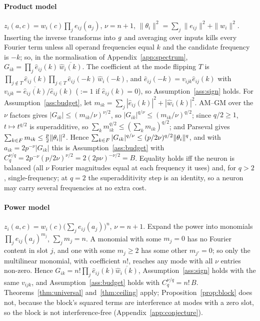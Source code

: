 \paragraph{Product model} $z_i(a,c)=w_i(c)\prod_je_{ij}(a_j)$, $\nu=n+1$, $\|\theta_i\|^2=\sum_j\|e_{ij}\|^2+\|w_i\|^2$.
Inserting the inverse transforms into $g$ and averaging over inputs kills every Fourier term unless all
operand frequencies equal $k$ and the candidate frequency is $-k$; so, in the normalisation of
Appendix~\ref{app:spectrum}, $G_{ik}=\prod_j\hat e_{ij}(k)\,\overline{\hat w_i(k)}$. The coefficient at the mode
flipping $T$ is $\prod_{j\notin T}\hat e_{ij}(k)\prod_{j\in T}\hat e_{ij}(-k)\,\hat w_i(-k)$, and
$\hat e_{ij}(-k)=v_{ijk}\hat e_{ij}(k)$ with $v_{ijk}=\overline{\hat e_{ij}(k)}/\hat e_{ij}(k)$ ($:=1$ if
$\hat e_{ij}(k)=0$), so Assumption~\ref{ass:sign} holds. For Assumption~\ref{ass:budget}, let
$m_{ik}=\sum_j|\hat e_{ij}(k)|^2+|\hat w_i(k)|^2$. AM--GM over the $\nu$ factors gives
$|G_{ik}|\le(m_{ik}/\nu)^{\nu/2}$, so $|G_{ik}|^{q/\nu}\le(m_{ik}/\nu)^{q/2}$; since $q/2\ge1$, $t\mapsto t^{q/2}$ is
superadditive, so $\sum_km_{ik}^{q/2}\le(\sum_km_{ik})^{q/2}$; and Parseval gives
$\sum_{k\in F}m_{ik}\le\tfrac p2\|\theta_i\|^2$. Hence $\sum_{k\in F}|G_{ik}|^{q/\nu}\le(p/2\nu)^{q/2}\|\theta_i\|^q$,
and with $a_{ik}=2p^{-\nu}|G_{ik}|$ this is Assumption~\ref{ass:budget} with
$C_q^{\nu/q}=2p^{-\nu}(p/2\nu)^{\nu/2}=2(2p\nu)^{-\nu/2}=B$. Equality holds iff the neuron is balanced (all $\nu$
Fourier magnitudes equal at each frequency it uses) and, for $q>2$, single-frequency; at $q=2$ the
superadditivity step is an identity, so a neuron may carry several frequencies at no extra cost.

\paragraph{Power model} $z_i(a,c)=w_i(c)\big(\sum_je_{ij}(a_j)\big)^n$, $\nu=n+1$. Expand the power into monomials
$\prod_je_{ij}(a_j)^{m_j}$, $\sum_jm_j=n$. A monomial with some $m_j=0$ has no Fourier content in slot $j$, and
one with some $m_j\ge2$ has some other $m_{j'}=0$; so only the multilinear monomial, with coefficient $n!$,
reaches any mode with all $\nu$ entries non-zero. Hence $G_{ik}=n!\prod_j\hat e_{ij}(k)\overline{\hat w_i(k)}$,
Assumption~\ref{ass:sign} holds with the same $v_{ijk}$, and Assumption~\ref{ass:budget} holds with
$C_q^{\nu/q}=n!\,B$. Theorems~\ref{thm:universal} and~\ref{thm:ceiling} apply; Proposition~\ref{prop:block} does
not, because the block's squared terms are interference at modes with a zero slot, so the block is not
interference-free (Appendix~\ref{app:conjecture}).

